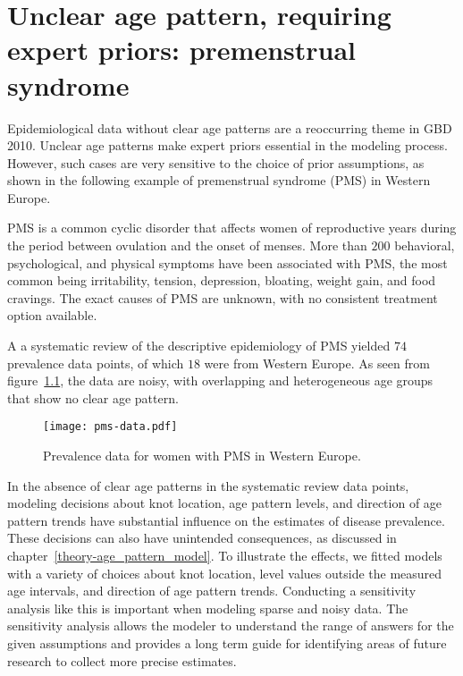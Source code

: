 \chapter{Unclear age pattern, requiring expert priors: premenstrual syndrome}
\label{applications-priors_knots_select}

Epidemiological data without clear age patterns are a reoccurring
theme in GBD 2010.  Unclear age patterns make expert priors
essential in the modeling process.  However, such cases are very
sensitive to the choice of prior assumptions, as shown in the
following example of premenstrual syndrome (PMS) in Western Europe.

PMS is a common cyclic disorder that affects women of reproductive
years during the period between ovulation and the onset of menses.
More than $200$ behavioral, psychological, and physical symptoms have been
associated with PMS, the most common being irritability, tension,
depression, bloating, weight gain, and food cravings.  The exact causes
of PMS are unknown, with no consistent
treatment option available. \cite{dickerson_premenstrual_2003, singh_incidence_1998,
  goodale_alleviation_1990}

A a systematic review of the descriptive
epidemiology of PMS yielded $74$ prevalence
data points, of which $18$ were from Western Europe.\cite{vos_years_2012}
  As seen from
figure~\ref{fig:app-pms_data}, the data are noisy, with overlapping and
heterogeneous age groups that show no clear age pattern.

    \begin{figure}[h]
        \begin{center}
            \texttt{[image: pms-data.pdf]}
        \end{center}
        \caption[Systematic review data for premenstrual syndrome.]{Prevalence
          data for women with PMS in Western Europe.}
        \label{fig:app-pms_data}
    \end{figure}


In the absence of clear age patterns in the systematic review data
points, modeling decisions about knot location, age pattern levels, and
direction of age pattern trends have substantial influence on the estimates of
disease prevalence.  These decisions can also have unintended
consequences, as discussed in chapter~\ref{theory-age_pattern_model}.
To illustrate the effects, we fitted models with a variety of choices
about knot location, level values outside the measured age
intervals, and direction of age pattern trends.  Conducting a sensitivity analysis
like this is important when modeling sparse and noisy data.  The sensitivity analysis allows
the modeler to understand the range of answers for the given assumptions
and provides a long term guide for identifying areas of future research
to collect more precise estimates.

